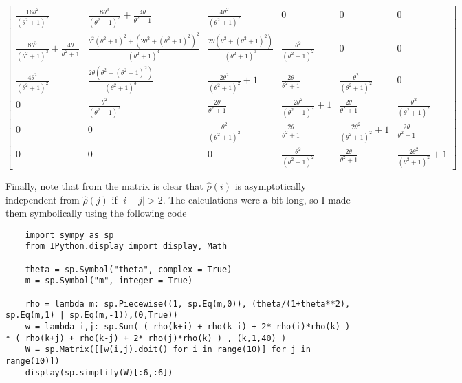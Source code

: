 \[ \left[\begin{matrix}\frac{16 \theta^{2}}{\left(\theta^{2} + 1\right)^{2}} & \frac{8 \theta^{3}}{\left(\theta^{2} + 1\right)^{3}} + \frac{4 \theta}{\theta^{2} + 1} & \frac{4 \theta^{2}}{\left(\theta^{2} + 1\right)^{2}} & 0 & 0 & 0\\\frac{8 \theta^{3}}{\left(\theta^{2} + 1\right)^{3}} + \frac{4 \theta}{\theta^{2} + 1} & \frac{\theta^{2} \left(\theta^{2} + 1\right)^{2} + \left(2 \theta^{2} + \left(\theta^{2} + 1\right)^{2}\right)^{2}}{\left(\theta^{2} + 1\right)^{4}} & \frac{2 \theta \left(\theta^{2} + \left(\theta^{2} + 1\right)^{2}\right)}{\left(\theta^{2} + 1\right)^{3}} & \frac{\theta^{2}}{\left(\theta^{2} + 1\right)^{2}} & 0 & 0\\\frac{4 \theta^{2}}{\left(\theta^{2} + 1\right)^{2}} & \frac{2 \theta \left(\theta^{2} + \left(\theta^{2} + 1\right)^{2}\right)}{\left(\theta^{2} + 1\right)^{3}} & \frac{2 \theta^{2}}{\left(\theta^{2} + 1\right)^{2}} + 1 & \frac{2 \theta}{\theta^{2} + 1} & \frac{\theta^{2}}{\left(\theta^{2} + 1\right)^{2}} & 0\\0 & \frac{\theta^{2}}{\left(\theta^{2} + 1\right)^{2}} & \frac{2 \theta}{\theta^{2} + 1} & \frac{2 \theta^{2}}{\left(\theta^{2} + 1\right)^{2}} + 1 & \frac{2 \theta}{\theta^{2} + 1} & \frac{\theta^{2}}{\left(\theta^{2} + 1\right)^{2}}\\0 & 0 & \frac{\theta^{2}}{\left(\theta^{2} + 1\right)^{2}} & \frac{2 \theta}{\theta^{2} + 1} & \frac{2 \theta^{2}}{\left(\theta^{2} + 1\right)^{2}} + 1 & \frac{2 \theta}{\theta^{2} + 1}\\0 & 0 & 0 & \frac{\theta^{2}}{\left(\theta^{2} + 1\right)^{2}} & \frac{2 \theta}{\theta^{2} + 1} & \frac{2 \theta^{2}}{\left(\theta^{2} + 1\right)^{2}} + 1\end{matrix}\right]\]

Finally, note that from the matrix is clear that $\hat{\rho}(i)$ is asymptotically independent from $\hat{\rho}(j)$ if $|i-j| > 2$. The calculations were a bit long, so I made them symbolically using the following code

\begin{verbatim}
    import sympy as sp
    from IPython.display import display, Math

    theta = sp.Symbol("theta", complex = True)
    m = sp.Symbol("m", integer = True)

    rho = lambda m: sp.Piecewise((1, sp.Eq(m,0)), (theta/(1+theta**2), sp.Eq(m,1) | sp.Eq(m,-1)),(0,True))
    w = lambda i,j: sp.Sum( ( rho(k+i) + rho(k-i) + 2* rho(i)*rho(k) ) * ( rho(k+j) + rho(k-j) + 2* rho(j)*rho(k) ) , (k,1,40) )
    W = sp.Matrix([[w(i,j).doit() for i in range(10)] for j in range(10)])
    display(sp.simplify(W)[:6,:6])
\end{verbatim}